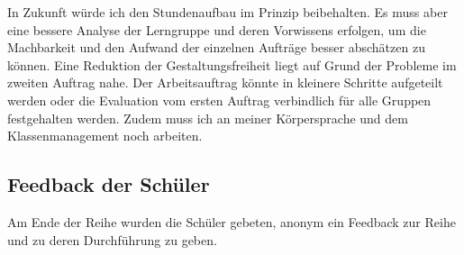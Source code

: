In Zukunft würde ich den Stundenaufbau im Prinzip beibehalten. Es muss aber eine bessere Analyse der Lerngruppe und deren Vorwissens erfolgen, um die Machbarkeit und den Aufwand der einzelnen Aufträge besser abschätzen zu können. Eine Reduktion der Gestaltungsfreiheit liegt auf Grund der Probleme im zweiten Auftrag nahe. Der Arbeitsauftrag könnte in kleinere Schritte aufgeteilt werden oder die Evaluation vom ersten Auftrag verbindlich für alle Gruppen festgehalten werden. Zudem muss ich an meiner Körpersprache und dem Klassenmanagement noch arbeiten. 
\subsection{Feedback der Schüler}
Am Ende der Reihe wurden die Schüler gebeten, anonym ein Feedback zur Reihe und zu deren Durchführung zu geben.